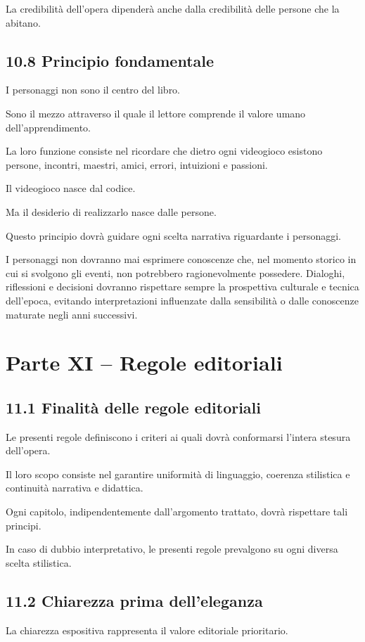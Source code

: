 \documentclass{article}
\begin{document}
La credibilità dell'opera dipenderà anche dalla credibilità delle persone che la abitano.

\subsection{10.8 Principio fondamentale}
I personaggi non sono il centro del libro.

Sono il mezzo attraverso il quale il lettore comprende il valore umano dell'apprendimento.

La loro funzione consiste nel ricordare che dietro ogni videogioco esistono persone, incontri, maestri, amici, errori,
intuizioni e passioni.

Il videogioco nasce dal codice.

Ma il desiderio di realizzarlo nasce dalle persone.

Questo principio dovrà guidare ogni scelta narrativa riguardante i personaggi.

I personaggi non dovranno mai esprimere conoscenze che, nel momento storico in cui si svolgono gli eventi, non
potrebbero ragionevolmente possedere. Dialoghi, riflessioni e decisioni dovranno rispettare sempre la prospettiva
culturale e tecnica dell'epoca, evitando interpretazioni influenzate dalla sensibilità o dalle conoscenze maturate
negli anni successivi.

\section{Parte XI – Regole editoriali}
\subsection{11.1 Finalità delle regole editoriali}
Le presenti regole definiscono i criteri ai quali dovrà conformarsi l'intera stesura dell'opera.

Il loro scopo consiste nel garantire uniformità di linguaggio, coerenza stilistica e continuità narrativa e didattica.

Ogni capitolo, indipendentemente dall'argomento trattato, dovrà rispettare tali principi.

In caso di dubbio interpretativo, le presenti regole prevalgono su ogni diversa scelta stilistica.

\subsection[11.2 Chiarezza prima dell{}'eleganza]{11.2 Chiarezza prima dell'eleganza}
La chiarezza espositiva rappresenta il valore editoriale prioritario.
\end{document}
